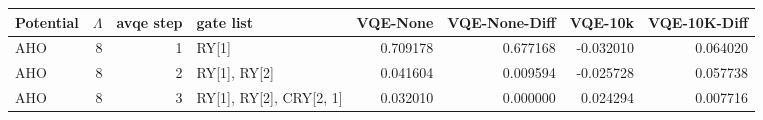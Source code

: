 \begin{tabular}{lrrlrrrr}
\toprule
Potential & $\Lambda$ & avqe step & gate list & VQE-None & VQE-None-Diff & VQE-10k & VQE-10K-Diff \\
\midrule
AHO & 8 & 1 & RY[1] & 0.709178 & 0.677168 & -0.032010 & 0.064020 \\
AHO & 8 & 2 & RY[1], RY[2] & 0.041604 & 0.009594 & -0.025728 & 0.057738 \\
AHO & 8 & 3 & RY[1], RY[2], CRY[2, 1] & 0.032010 & 0.000000 & 0.024294 & 0.007716 \\
\bottomrule
\end{tabular}
